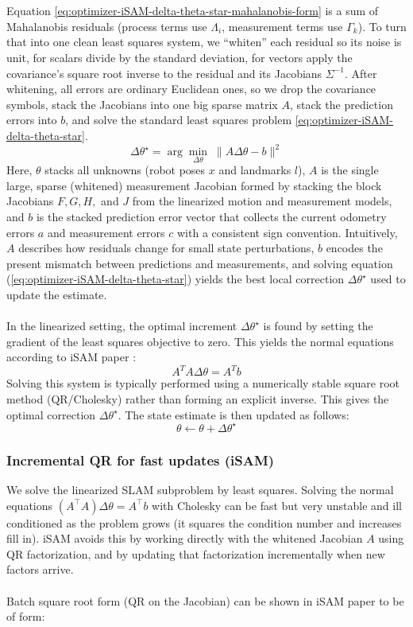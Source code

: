 \\ \\
Equation \eqref{eq:optimizer-iSAM-delta-theta-star-mahalanobis-form} is a sum of Mahalanobis residuals (process terms use $\Lambda_i$, measurement terms use $\Gamma_k$). To turn that into one clean least squares system, we ``whiten'' each residual so its noise is unit, for scalars divide by the standard deviation, for vectors apply the covariance's square root inverse to the residual and its Jacobians $\Sigma^{-1}$. After whitening, all errors are ordinary Euclidean ones, so we drop the covariance symbols, stack the Jacobians into one big sparse matrix $A$, stack the prediction errors into $b$, and solve the standard least squares problem \eqref{eq:optimizer-iSAM-delta-theta-star}.
\begin{equation}
    \Delta\theta^\star = \arg\min_{\Delta\theta}\; \|A\Delta\theta - b\|^2
    \label{eq:optimizer-iSAM-delta-theta-star}
\end{equation}
Here, $\theta$ stacks all unknowns (robot poses $x$ and landmarks $l$), $A$ is the single large, sparse (whitened) measurement Jacobian formed by stacking the block Jacobians $F, G, H,$ and $J$ from the linearized motion and measurement models, and $b$ is the stacked prediction error vector that collects the current odometry errors $a$ and measurement errors $c$ with a consistent sign convention. Intuitively, $A$ describes how residuals change for small state perturbations, $b$ encodes the present mismatch between predictions and measurements, and solving equation (\ref{eq:optimizer-iSAM-delta-theta-star}) yields the best local correction $\Delta\theta^\star$ used to update the estimate.
\\ \\
In the linearized setting, the optimal increment $\Delta\theta^\star$ is found by setting the gradient of the least squares objective to zero. This yields the normal equations according to iSAM paper \cite{iSAM_paper}:
$$
    A^{T}A\Delta\theta = A^{T}b
$$
Solving this system is typically performed using a numerically stable square root method (QR/Cholesky) rather than forming an explicit inverse. This gives the optimal correction $\Delta\theta^\star$. The state estimate is then updated as follows:
$$
    \theta \leftarrow \theta + \Delta\theta^\star
$$



\subsubsection{Incremental QR for fast updates (iSAM)}
We solve the linearized SLAM subproblem by least squares. Solving the normal equations $(A^\top A)\Delta\theta = A^\top b$ with Cholesky can be fast but very unstable and ill conditioned as the problem grows (it squares the condition number and increases fill in). iSAM avoids this by working directly with the whitened Jacobian $A$ using QR factorization, and by updating that factorization incrementally when new factors arrive.
\\ \\
Batch square root form (QR on the Jacobian) can be shown in iSAM paper \cite{iSAM_paper} to be of form:

